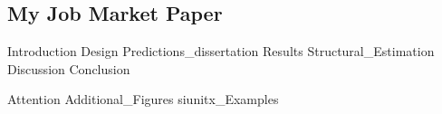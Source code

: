 \documentclass[11pt, a4paper, twoside]{book}
\begin{document}
\begin{refsection}

\makeatletter
\renewcommand{\@makefntext}[1]{\@makefntextorig{#1}}
\makeatother
\chapter
	[My Job Market Paper]
	{My Job Market Paper%
	 \setcounter{footnote}{1}\textsuperscript{\Large{}}%
	}
\label{diss:JMP}
\renewcommand{\thefootnote}{\fnsymbol{footnote}}
\footnotetext[1]{\:\protect}
\renewcommand{\thefootnote}{\thefootnoteorig}
\makeatletter
\renewcommand{\@makefntext}[1]{\@makefntextcustom{#1}}
\renewcommand{\@makefnmark}{\@makefnmarkorig}
\makeatother
\setcounter{footnote}{0}

\graphicspath{{1_Example_Content/}}
{Introduction}
{Design}
{Predictions_dissertation}
{Results}
{Structural_Estimation}
{Discussion}
{Conclusion}

\begin{subappendices}
	\label{sec:appendix}
	\FloatBarrier
	{Attention}
	\FloatBarrier
	\newpage
	{Additional_Figures}
	\FloatBarrier
	{siunitx_Examples}
	\clearpage
\end{subappendices}

\begin{refcontext}[sorting=nyt]
	\printbibliography[heading=subbibliography]
\end{refcontext}

\end{refsection}
\end{document}
